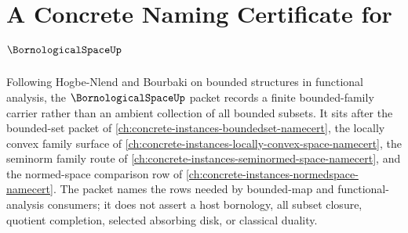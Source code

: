 \chapter{A Concrete Naming Certificate for $\BornologicalSpaceUp$}
\label{ch:concrete-instances-bornological-space-namecert}

Following Hogbe-Nlend and Bourbaki on bounded structures in functional analysis, the $\BornologicalSpaceUp$ packet records a finite bounded-family carrier rather than an ambient collection of all bounded subsets. It sits after the bounded-set packet of \autoref{ch:concrete-instances-boundedset-namecert}, the locally convex family surface of \autoref{ch:concrete-instances-locally-convex-space-namecert}, the seminorm family route of \autoref{ch:concrete-instances-seminormed-space-namecert}, and the normed-space comparison row of \autoref{ch:concrete-instances-normedspace-namecert}. The packet names the rows needed by bounded-map and functional-analysis consumers; it does not assert a host bornology, all subset closure, quotient completion, selected absorbing disk, or classical duality.

